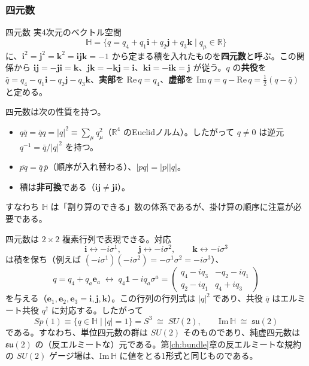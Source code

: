 \documentclass[uplatex, dvipdfmx, book]{jsbook}
\let\origsubsubsection\subsubsection
\renewcommand{\subsection}{\origsubsubsection}
\renewcommand{\subsubsection}{\paragraph}
\begin{document}
\subsection{四元数}

\begin{mydef}{四元数}{}
実4次元のベクトル空間
\begin{equation*}
    \mathbb{H} = \{ q = q_4 + q_1 \bm{i} + q_2 \bm{j} + q_3 \bm{k} \mid q_\mu \in \mathbb{R} \}
\end{equation*}
に、$\bm{i}^2 = \bm{j}^2 = \bm{k}^2 = \bm{i}\bm{j}\bm{k} = -1$ から定まる積を入れたものを\textbf{四元数}と呼ぶ。この関係から $\bm{i}\bm{j} = -\bm{j}\bm{i} = \bm{k}$、$\bm{j}\bm{k} = -\bm{k}\bm{j} = \bm{i}$、$\bm{k}\bm{i} = -\bm{i}\bm{k} = \bm{j}$ が従う。$q$ の\textbf{共役}を $\bar{q} = q_4 - q_1\bm{i} - q_2\bm{j} - q_3\bm{k}$、\textbf{実部}を $\mathrm{Re}\, q = q_4$、\textbf{虚部}を $\mathrm{Im}\, q = q - \mathrm{Re}\,q = \frac{1}{2}(q - \bar{q})$ と定める。
\end{mydef}

四元数は次の性質を持つ。
\begin{itemize}
    \item $q\bar{q} = \bar{q}q = |q|^2 \equiv \sum_\mu q_\mu^2$（$\mathbb{R}^4$ のEuclidノルム）。したがって $q \neq 0$ は逆元 $q^{-1} = \bar{q}/|q|^2$ を持つ。
    \item $\overline{pq} = \bar{q}\,\bar{p}$（順序が入れ替わる）、$|pq| = |p||q|$。
    \item 積は\textbf{非可換}である（$\bm{i}\bm{j} \neq \bm{j}\bm{i}$）。
\end{itemize}
すなわち $\mathbb{H}$ は「割り算のできる」数の体系であるが、掛け算の順序に注意が必要である。

四元数は $2 \times 2$ 複素行列で表現できる。対応
\begin{equation}
    \bm{i} \leftrightarrow -i\sigma^1, \qquad \bm{j} \leftrightarrow -i\sigma^2, \qquad \bm{k} \leftrightarrow -i\sigma^3
    \label{eq:quaternion-pauli}
\end{equation}
は積を保ち（例えば $(-i\sigma^1)(-i\sigma^2) = -\sigma^1\sigma^2 = -i\sigma^3$）、
\begin{equation}
    q = q_4 + q_a \bm{e}_a \;\leftrightarrow\; q_4 \bm{1} - i q_a \sigma^a = \begin{pmatrix} q_4 - i q_3 & -q_2 - i q_1 \\ q_2 - i q_1 & q_4 + i q_3 \end{pmatrix}
\end{equation}
を与える（$\bm{e}_1, \bm{e}_2, \bm{e}_3 = \bm{i}, \bm{j}, \bm{k}$）。この行列の行列式は $|q|^2$ であり、共役 $\bar{q}$ はエルミート共役 $q^\dagger$ に対応する。したがって
\begin{equation}
    Sp(1) \equiv \{ q \in \mathbb{H} \mid |q| = 1 \} = S^3 \;\cong\; SU(2), \qquad \mathrm{Im}\,\mathbb{H} \;\cong\; \mathfrak{su}(2)
\end{equation}
である。すなわち、単位四元数の群は $SU(2)$ そのものであり、純虚四元数は $\mathfrak{su}(2)$ の（反エルミートな）元である。第\ref{ch:bundle}章の反エルミートな規約の $SU(2)$ ゲージ場は、$\mathrm{Im}\,\mathbb{H}$ に値をとる1形式と同じものである。
\end{document}
